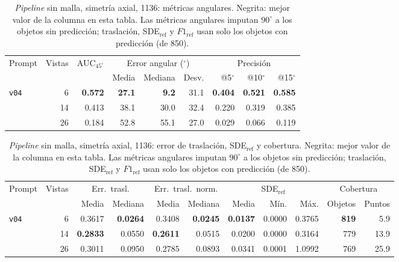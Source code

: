 
\begin{table}[htbp]
\centering
\caption{\textit{Pipeline} sin malla, simetría axial, 1136: métricas angulares. Negrita: mejor valor de la columna en esta tabla. Las métricas angulares imputan $90^\circ$ a los objetos sin predicción; traslación, SDE$_{\mathrm{ref}}$ y $F1_{\mathrm{ref}}$ usan solo los objetos con predicción (de 850).}
\label{tab:axis_1136_angular}
\begin{adjustbox}{max width=\textwidth}
\begin{tabular}{lrrrrrrrr}
\toprule
\multirow{2}{*}{Prompt} & \multirow{2}{*}{Vistas} & \multirow{2}{*}{AUC$_{45^\circ}$} & \multicolumn{3}{c}{Error angular ($^\circ$)} & \multicolumn{3}{c}{Precisión} \\
\cmidrule(lr){4-6} \cmidrule(lr){7-9}
 &  &  & Media & Mediana & Desv. & @5$^\circ$ & @10$^\circ$ & @15$^\circ$ \\
\midrule
\multirow{3}{*}{\texttt{v04}} & 6 & \textbf{0.572} & \textbf{27.1} & \textbf{9.2} & 31.1 & \textbf{0.404} & \textbf{0.521} & \textbf{0.585} \\
 & 14 & 0.413 & 38.1 & 30.0 & 32.4 & 0.220 & 0.319 & 0.385 \\
 & 26 & 0.184 & 52.8 & 55.1 & 27.0 & 0.029 & 0.066 & 0.119 \\
\bottomrule
\end{tabular}
\end{adjustbox}
\end{table}

\begin{table}[htbp]
\centering
\caption{\textit{Pipeline} sin malla, simetría axial, 1136: error de traslación, SDE$_{\mathrm{ref}}$ y cobertura. Negrita: mejor valor de la columna en esta tabla. Las métricas angulares imputan $90^\circ$ a los objetos sin predicción; traslación, SDE$_{\mathrm{ref}}$ y $F1_{\mathrm{ref}}$ usan solo los objetos con predicción (de 850).}
\label{tab:axis_1136_posicion}
\begin{adjustbox}{max width=\textwidth}
\begin{tabular}{lrrrrrrrrrr}
\toprule
\multirow{2}{*}{Prompt} & \multirow{2}{*}{Vistas} & \multicolumn{2}{c}{Err.\ trasl.} & \multicolumn{2}{c}{Err.\ trasl.\ norm.} & \multicolumn{3}{c}{SDE$_{\mathrm{ref}}$} & \multicolumn{2}{c}{Cobertura} \\
\cmidrule(lr){3-4} \cmidrule(lr){5-6} \cmidrule(lr){7-9} \cmidrule(lr){10-11}
 &  & Media & Mediana & Media & Mediana & Media & Mín. & Máx. & Objetos & Puntos \\
\midrule
\multirow{3}{*}{\texttt{v04}} & 6 & 0.3617 & \textbf{0.0264} & 0.3408 & \textbf{0.0245} & \textbf{0.0137} & 0.0000 & 0.3765 & \textbf{819} & 5.9 \\
 & 14 & \textbf{0.2833} & 0.0550 & \textbf{0.2611} & 0.0515 & 0.0200 & 0.0000 & 0.3164 & 779 & 13.9 \\
 & 26 & 0.3011 & 0.0950 & 0.2785 & 0.0893 & 0.0341 & 0.0001 & 1.0992 & 769 & 25.9 \\
\bottomrule
\end{tabular}
\end{adjustbox}
\end{table}
